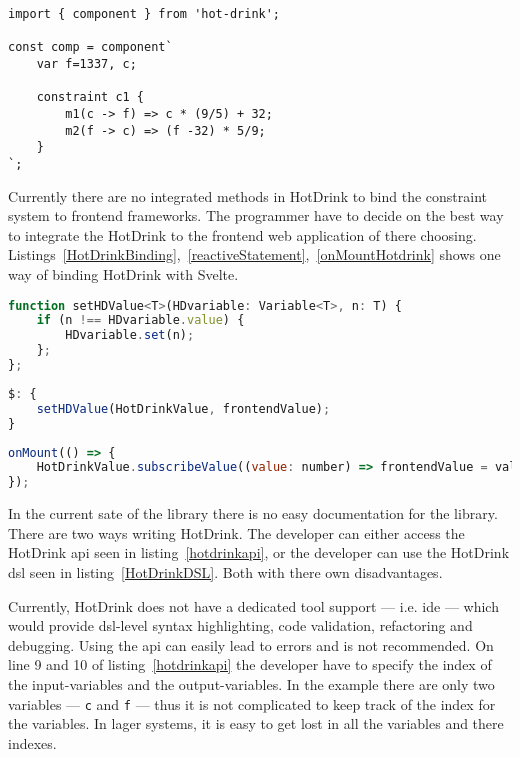 \begin{lstlisting}[caption={Example of the HotDrink \gls{dsl}},label=HotDrinkDSL, language=hotdrink]
import { component } from 'hot-drink';

const comp = component`
    var f=1337, c;

    constraint c1 {
        m1(c -> f) => c * (9/5) + 32;
        m2(f -> c) => (f -32) * 5/9;
    }
`;
\end{lstlisting}

Currently there are no integrated methods in HotDrink to bind the constraint system to frontend frameworks. The programmer have to decide on the best way to integrate the HotDrink to the frontend web application of there choosing. Listings~\ref{HotDrinkBinding},~\ref{reactiveStatement},~\ref{onMountHotdrink} shows one way of binding HotDrink with Svelte.

\begin{lstlisting}[caption={Function for binding HotDrink and Svelte variable},label=HotDrinkBinding, language=javascript]
function setHDValue<T>(HDvariable: Variable<T>, n: T) {
    if (n !== HDvariable.value) { 
        HDvariable.set(n);
    };
};
\end{lstlisting}

\begin{lstlisting}[caption={Using the reactive statement, in Svelte~\cite{sveltedocs}, to update HotDrink corresopnding value, and trigger HotDrink to enforce the constraint system},label=reactiveStatement, language=javascript]
$: {
    setHDValue(HotDrinkValue, frontendValue);
}
\end{lstlisting}

\begin{lstlisting}[caption={Using the onMount callback, in Svelte~\cite{sveltedocs}, to update the frontend value that correspont to the same value in HotDrink, when the HotDrink value changes.},label=onMountHotdrink, language=javascript]
onMount(() => {
    HotDrinkValue.subscribeValue((value: number) => frontendValue = value);
});
\end{lstlisting}

In the current sate of the library there is no easy documentation for the library. There are two ways writing HotDrink. The developer can either access the HotDrink \gls{api} seen in listing~\ref{hotdrinkapi}, or the developer can use the HotDrink \gls{dsl} seen in listing~\ref{HotDrinkDSL}. Both with there own disadvantages. 

Currently, HotDrink does not have a dedicated tool support --- i.e. \gls{ide} --- which would provide \gls{dsl}-level syntax highlighting, code validation, refactoring and debugging. Using the \gls{api} can easily lead to errors and is not recommended. On line 9 and 10 of listing~\ref{hotdrinkapi} the developer have to specify the index of the input-variables and the output-variables. In the example there are only two variables --- \texttt{c} and \texttt{f} --- thus it is not complicated to keep track of the index for the variables. In lager systems, it is easy to get lost in all the variables and there indexes.


